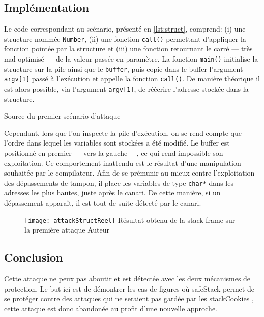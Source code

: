 \subsection{Implémentation}

Le code correspondant au scénario, présenté en \autoref{lst:struct}, comprend: (i) une structure nommée \texttt{Number}, (ii) une fonction \texttt{call()} permettant d'appliquer la fonction pointée par la structure et (iii) une fonction retournant le carré --- très mal optimisé --- de la valeur passée en paramètre. La fonction \texttt{main()} initialise la structure sur la pile ainsi que le \texttt{buffer}, puis copie dans le buffer l'argument \texttt{argv[1]} passé à l'exécution et appelle la fonction \texttt{call()}. De manière théorique il est alors possible, via l'argument \texttt{argv[1]}, de réécrire l'adresse stockée dans la structure.

\begin{listing}
	\caption{Source du premier scénario d'attaque}
	\label{lst:struct}
\end{listing}

Cependant, lors que l'on inspecte la pile d'exécution, on se rend compte que l'ordre dans lequel les variables sont stockées a été modifié. Le \og buffer \fg est positionné en premier --- vers la gauche ---, ce qui rend impossible son exploitation. Ce comportement inattendu est le résultat d'une manipulation souhaitée par le compilateur. Afin de se prémunir au mieux contre l'exploitation des dépassements de tampon, il place les variables de type \texttt{char*} dans les adresses les plus hautes, juste après le canari. De cette manière, si un dépassement apparaît, il est tout de suite détecté par le canari.

\begin{figure}[H]
	\centering
	\texttt{[image: attackStructReel]}
	{Résultat obtenu de la \og stack frame \fg sur la première attaque}
	{Auteur}
	\label{fig:attackStructReel}
\end{figure}

\subsection{Conclusion}

Cette attaque ne peux pas aboutir et est détectée avec les deux mécanismes de protection. Le but ici est de démontrer les cas de figures où \og \gls{safeStack} \fg permet de se protéger contre des attaques qui ne seraient pas gardée par les \og \gls{stackCookies} \fg, cette attaque est donc abandonée au profit d'une nouvelle approche.


